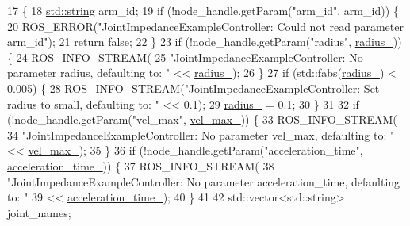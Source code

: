 \begin{DoxyCode}
17                                                                        \{
18   \hyperlink{namespacetesting_1_1internal_a8e8ff5b11e64078831112677156cb111}{std::string} arm\_id;
19   \textcolor{keywordflow}{if} (!node\_handle.getParam(\textcolor{stringliteral}{"arm\_id"}, arm\_id)) \{
20     ROS\_ERROR(\textcolor{stringliteral}{"JointImpedanceExampleController: Could not read parameter arm\_id"});
21     \textcolor{keywordflow}{return} \textcolor{keyword}{false};
22   \}
23   \textcolor{keywordflow}{if} (!node\_handle.getParam(\textcolor{stringliteral}{"radius"}, \hyperlink{classfranka__example__controllers_1_1JointImpedanceExampleController_ae312280e14358c15d9fc3398e149a6dc}{radius\_})) \{
24     ROS\_INFO\_STREAM(
25         \textcolor{stringliteral}{"JointImpedanceExampleController: No parameter radius, defaulting to: "} << 
      \hyperlink{classfranka__example__controllers_1_1JointImpedanceExampleController_ae312280e14358c15d9fc3398e149a6dc}{radius\_});
26   \}
27   \textcolor{keywordflow}{if} (std::fabs(\hyperlink{classfranka__example__controllers_1_1JointImpedanceExampleController_ae312280e14358c15d9fc3398e149a6dc}{radius\_}) < 0.005) \{
28     ROS\_INFO\_STREAM(\textcolor{stringliteral}{"JointImpedanceExampleController: Set radius to small, defaulting to: "} << 0.1);
29     \hyperlink{classfranka__example__controllers_1_1JointImpedanceExampleController_ae312280e14358c15d9fc3398e149a6dc}{radius\_} = 0.1;
30   \}
31 
32   \textcolor{keywordflow}{if} (!node\_handle.getParam(\textcolor{stringliteral}{"vel\_max"}, \hyperlink{classfranka__example__controllers_1_1JointImpedanceExampleController_a6a988f0c94bef853f6771068a49f66c2}{vel\_max\_})) \{
33     ROS\_INFO\_STREAM(
34         \textcolor{stringliteral}{"JointImpedanceExampleController: No parameter vel\_max, defaulting to: "} << 
      \hyperlink{classfranka__example__controllers_1_1JointImpedanceExampleController_a6a988f0c94bef853f6771068a49f66c2}{vel\_max\_});
35   \}
36   \textcolor{keywordflow}{if} (!node\_handle.getParam(\textcolor{stringliteral}{"acceleration\_time"}, \hyperlink{classfranka__example__controllers_1_1JointImpedanceExampleController_aed26e5a5b23daaaacbd810caad1e2343}{acceleration\_time\_})) \{
37     ROS\_INFO\_STREAM(
38         \textcolor{stringliteral}{"JointImpedanceExampleController: No parameter acceleration\_time, defaulting to: "}
39         << \hyperlink{classfranka__example__controllers_1_1JointImpedanceExampleController_aed26e5a5b23daaaacbd810caad1e2343}{acceleration\_time\_});
40   \}
41 
42   std::vector<std::string> joint\_names;

\end{DoxyCode}
